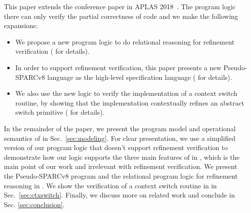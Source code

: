 This paper extends the conference paper in
APLAS 2018~\cite{zha18aplas}.
The program logic there can only verify the partial
correctness of \sparc{} code and we make the following
expansions:
\begin{itemize}
    \item We propose a new program logic to do
        relational reasoning for refinement verification
        (\Sec{\ref{subsec:rellogic}} for details).
    \item In order to support refinement verification,
        this paper presents a new Pseudo-SPARCv8 language
        as the high-level
        specification language
        (\Sec{\ref{subsec:High-level Pseudo-SPARCv8 Language}}
        for details).
    \item We also use the new logic to verify the implementation
        of a context switch routine, by showing that
        the implementation contextually
        refines an abstract switch primitive
        (\Sec{\ref{sec:ctxswitch}} for details).
\end{itemize}

In the remainder of the paper,
we present the program model
and operational semantics of \sparc{} in Sec.~\ref{sec:modeling}.
For clear presentation, we use a
simplified version of our program logic that
doesn't support refinement verification to
demonstrate how our logic supports the three main
features of \sparc{} in \Sec{\ref{sec:logic}},
which is the main point
of our work and irrelevant with
refinement verification.
We present the Pseudo-SPARCv8 program and
the relational program logic for refinement reasoning
in \Sec{\ref{sec:refine-verification-sparc}}.
We show the verification of a context switch routine
in \sparc{} in Sec.~\ref{sec:ctxswitch}.
Finally, we discuss more on
related work and conclude in Sec. \ref{sec:conclusion}.
